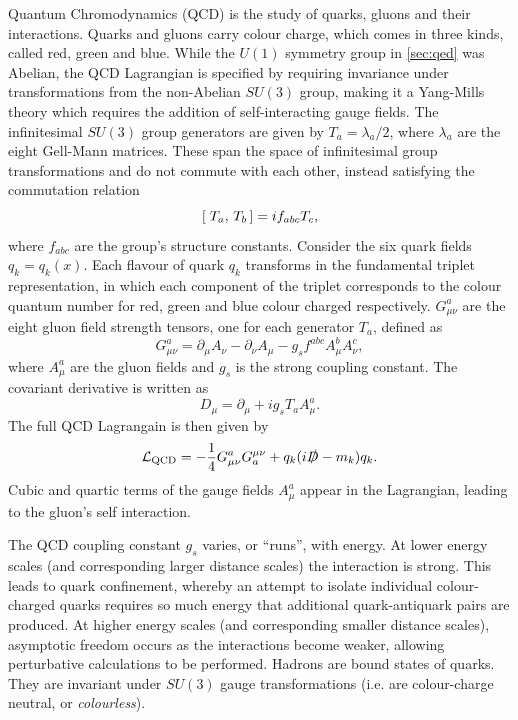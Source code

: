 Quantum Chromodynamics (QCD) is the study of quarks, gluons and their interactions.
Quarks and gluons carry colour charge, which comes in three kinds, called red, green and blue.
While the $U(1)$ symmetry group in \cref{sec:qed} was Abelian, the QCD Lagrangian is specified by requiring invariance under transformations from the non-Abelian $SU(3)$ group, making it a Yang\nobreakdash-Mills theory \cite{PhysRev.96.191} which requires the addition of self-interacting gauge fields.
The infinitesimal $SU(3)$ group generators are given by $T_a = \lambda_a / 2$, where $\lambda_a$ are the eight Gell\nobreakdash-Mann matrices.
These span the space of infinitesimal group transformations and do not commute with each other, instead satisfying the commutation relation
%
\begin{equation}
  [\; T_a,\,T_b\,] = i f_{abc} T_c ,
\end{equation}
%
where $f_{abc}$ are the group's structure constants.
Consider the six quark fields $q_k = q_k(x)$.
Each flavour of quark $q_k$ transforms in the fundamental triplet representation, in which each component of the triplet corresponds to the colour quantum number for red, green and blue colour charged respectively.
$G^{a}_{\mu\nu}$ are the eight gluon field strength tensors, one for each generator $T_a$, defined as
%
\begin{equation}\label{eq:qcd_field_strength_tensor}
  G^a_{\mu\nu} = \partial_\mu A_\nu - \partial_\nu A_\mu - g_s f^{abc} A_\mu^b A_\nu^c ,
\end{equation}
%
where $A_\mu^a$ are the gluon fields and $g_s$ is the strong coupling constant. The covariant derivative is written as
%
\begin{equation}\label{eq:qcd_covariant_derivative}
  D_\mu = \partial_\mu + i g_s T_a A_\mu^a .
\end{equation}
%
The full QCD Lagrangain is then given by
%
\begin{equation}\label{eq:qcd_lagrangian}
  \mathcal{L}_\textnormal{QCD} = 
  - \frac{1}{4} G^{a}_{\mu\nu} G_{a}^{\mu\nu}
  + q_k (i \slashed{D} - m_k) q_k .
\end{equation}
%
Cubic and quartic terms of the gauge fields $A^a_\mu$ appear in the Lagrangian, leading to the gluon's self interaction.

The QCD coupling constant $g_s$ varies, or ``runs'', with energy.
At lower energy scales (and corresponding larger distance scales) the interaction is strong.
This leads to quark confinement, whereby an attempt to isolate individual colour-charged quarks requires so much energy that additional quark-antiquark pairs are produced.
At higher energy scales (and corresponding smaller distance scales), asymptotic freedom occurs as the interactions become weaker, allowing perturbative calculations to be performed.
Hadrons are bound states of quarks.
They are invariant under $SU(3)$ gauge transformations (i.e. are colour-charge neutral, or \textit{colourless}).



